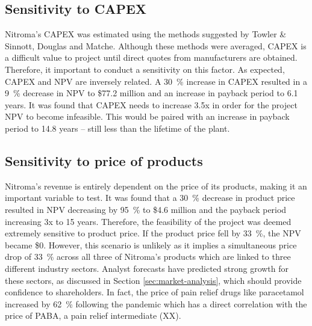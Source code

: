 \subsection{Sensitivity to CAPEX}
Nitroma’s CAPEX was estimated using the methods suggested by Towler \& Sinnott, Douglas and Matche. Although these methods were averaged, CAPEX is a difficult value to project until direct quotes from manufacturers are obtained. Therefore, it important to conduct a sensitivity on this factor. As expected, CAPEX and NPV are inversely related. A \SI{30}{\percent} increase in CAPEX resulted in a \SI{9}{\percent} decrease in NPV to \$77.2 million and an increase in payback period to 6.1 years. It was found that CAPEX needs to increase 3.5x in order for the project NPV to become infeasible. This would be paired with an increase in payback period to 14.8 years – still less than the lifetime of the plant.

\subsection{Sensitivity to price of products}
Nitroma’s revenue is entirely dependent on the price of its products, making it an important variable to test. It was found that a \SI{30}{\percent} decrease in product price resulted in NPV decreasing by \SI{95}{\percent} to \$4.6 million and the payback period increasing 3x to 15 years. Therefore, the feasibility of the project was deemed extremely sensitive to product price.  If the product price fell by \SI{33}{\percent}, the NPV became \$0. However, this scenario is unlikely as it implies a simultaneous price drop of \SI{33}{\percent} across all three of Nitroma’s products which are linked to three different industry sectors. Analyst forecasts have predicted strong growth for these sectors, as discussed in Section \ref{sec:market-analysis}, which should provide confidence to shareholders. In fact, the price of pain relief drugs like paracetamol increased by \SI{62}{\percent} following the pandemic which has a direct correlation with the price of PABA, a pain relief intermediate (XX).

